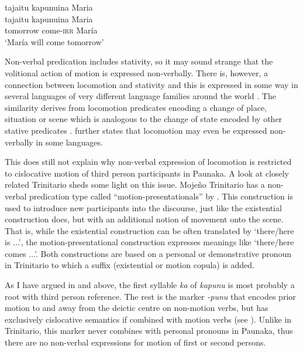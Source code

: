 \ea\label{ex:new23-come}
\begingl
\glpreamble tajaitu kapunuina Maria\\
\gla tajaitu kapunuina Maria\\
\glb tomorrow come-\textsc{irr} María\\
\glft ‘María will come tomorrow’
\endgl
\trailingcitation{[jxx-p150920l.009]}
\xe

Non-verbal predication includes stativity, so it may sound strange that the volitional action of motion is expressed non-verbally. There is, however, a connection between locomotion and stativity and this is expressed in some way in several languages of very different language families around the world \citep[]{Payne2008}. The similarity derives from locomotion predicates encoding a change of place, situation or scene which is analogous to the change of state encoded by other stative predicates \citep[249]{Payne2008}. \citet[57, 113]{Payne1997} further states that locomotion may even be expressed non-verbally in some languages.

This does still not explain why non-verbal expression of locomotion is restricted to cislocative motion of third person participants in Paunaka. A look at closely related Trinitario sheds some light on this issue. Mojeño Trinitario has a non-verbal predication type called “motion-presentationals” by \citet[68]{Rose2018a}. This construction is used to introduce new participants into the discourse, just like the existential construction does, but with an additional notion of movement onto the scene. That is, while the existential construction can be often translated by ‘there/here is ...’, the motion-presentational construction expresses meanings like ‘there/here comes ...’. Both constructions are based on a personal or demonstrative pronoun in Trinitario to which a suffix (existential or motion copula) is added. 

As I have argued in  and  above, the first syllable \textit{ka} of \textit{kapunu} is most probably a  root with third person reference. The rest is the  marker \textit{-punu} that encodes prior motion to and away from the deictic centre on non-motion verbs, but has exclusively cislocative semantics if combined with motion verbs (see ). Unlike in Trinitario, this marker never combines with personal pronouns in Paunaka, thus there are no non-verbal expressions for motion of first or second persons.

